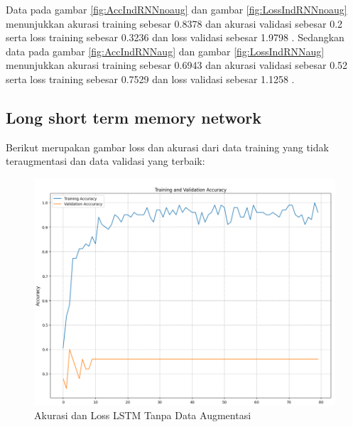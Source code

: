 Data pada gambar \ref{fig:AccIndRNNnoaug} dan gambar \ref{fig:LossIndRNNnoaug} menunjukkan akurasi training
sebesar 0.8378 dan akurasi validasi sebesar 0.2 serta loss training sebesar 0.3236
dan loss validasi sebesar 1.9798 . Sedangkan data pada gambar \ref{fig:AccIndRNNaug} dan gambar \ref{fig:LossIndRNNaug}
menunjukkan akurasi training sebesar 0.6943 dan akurasi validasi sebesar 0.52 serta
loss training sebesar 0.7529 dan loss validasi sebesar 1.1258 .

\subsection{Long short term memory network}
Berikut merupakan gambar loss dan akurasi dari data training yang tidak teraugmentasi dan
data validasi yang terbaik:

\begin{figure} [H] \centering
  \includegraphics[scale=0.6]{gambar/AccLSTMnoAug.png}
  \caption{Akurasi dan Loss LSTM Tanpa Data Augmentasi}
  \label{fig:AccLSTMnoaug}
\end{figure}


